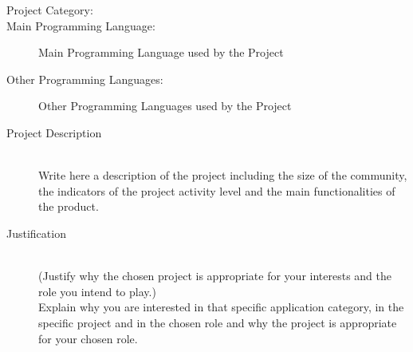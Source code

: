 \documentclass[runningheads]{llncs}
\begin{document}
\begin{description}
  \item[Project Category:]  %
  \item[Main Programming Language:] Main Programming Language used by the Project
  \item[Other Programming Languages:]  Other Programming Languages used by the Project
\end{description}
\begin{description}
  \item[Project Description]\mbox{}\\
    Write here a description of the project including the size of the community, the indicators of the project activity level
    and the main functionalities of the product.
\end{description}
\begin{description}
  \item[Justification]\mbox{}\\
   (Justify why the chosen project is appropriate for your interests and the role you intend to play.)\\
   Explain why you are interested in that specific application category, in the specific project and in the chosen role
   and why the project is appropriate for your chosen role.
\end{description}
\end{document}
